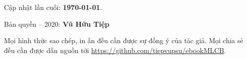 \thispagestyle{empty}

\Large{Cập nhật lần cuối: \textbf{\today}.}

\vspace{1cm} 

\vspace{1cm}
Bản quyền  -- 2020: \textbf{Vũ Hữu Tiệp}

Mọi hình thức sao chép, in ấn đều cần được sự đồng ý của tác giả. Mọi chia sẻ đều cần được dẫn nguồn tới \url{https://github.com/tiepvupsu/ebookMLCB}.
